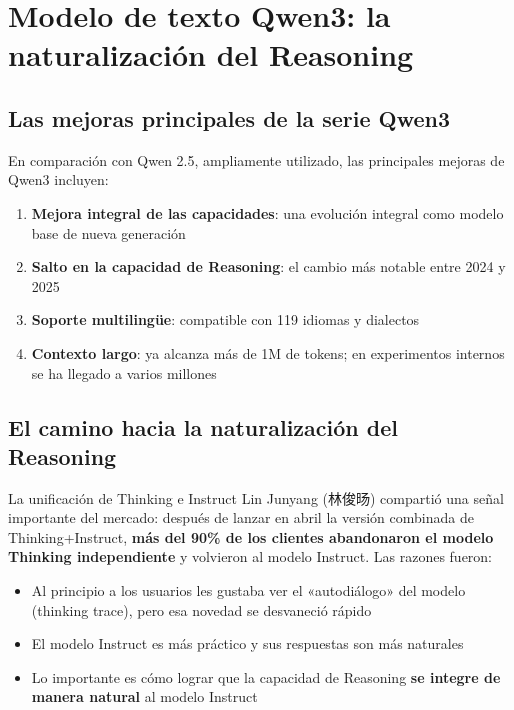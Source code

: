 \section{Modelo de texto Qwen3: la naturalización del Reasoning}

\subsection{Las mejoras principales de la serie Qwen3}

En comparación con Qwen 2.5, ampliamente utilizado, las principales mejoras de Qwen3 incluyen:

\begin{enumerate}
    \item \textbf{Mejora integral de las capacidades}: una evolución integral como modelo base de nueva generación
    \item \textbf{Salto en la capacidad de Reasoning}: el cambio más notable entre 2024 y 2025
    \item \textbf{Soporte multilingüe}: compatible con 119 idiomas y dialectos
    \item \textbf{Contexto largo}: ya alcanza más de 1M de tokens; en experimentos internos se ha llegado a varios millones
\end{enumerate}

\subsection{El camino hacia la naturalización del Reasoning}

\begin{importantbox}{La unificación de Thinking e Instruct}
Lin Junyang (林俊旸) compartió una señal importante del mercado: después de lanzar en abril la versión combinada de Thinking+Instruct, \textbf{más del 90\% de los clientes abandonaron el modelo Thinking independiente} y volvieron al modelo Instruct. Las razones fueron:
\begin{itemize}
    \item Al principio a los usuarios les gustaba ver el «autodiálogo» del modelo (thinking trace), pero esa novedad se desvaneció rápido
    \item El modelo Instruct es más práctico y sus respuestas son más naturales
    \item Lo importante es cómo lograr que la capacidad de Reasoning \textbf{se integre de manera natural} al modelo Instruct
\end{itemize}
\end{importantbox}

